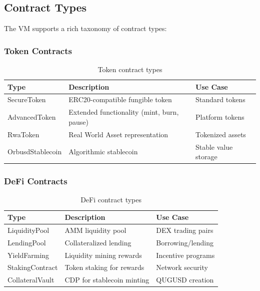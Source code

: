 \documentclass[11pt,a4paper]{article}
\begin{document}
\subsection{Contract Types}

The VM supports a rich taxonomy of contract types:

\subsubsection{Token Contracts}

\begin{table}[H]
\centering
\begin{tabular}{lll}
\toprule
\textbf{Type} & \textbf{Description} & \textbf{Use Case} \\
\midrule
SecureToken & ERC20-compatible fungible token & Standard tokens \\
AdvancedToken & Extended functionality (mint, burn, pause) & Platform tokens \\
RwaToken & Real World Asset representation & Tokenized assets \\
OrbusdStablecoin & Algorithmic stablecoin & Stable value storage \\
\bottomrule
\end{tabular}
\caption{Token contract types}
\end{table}

\subsubsection{DeFi Contracts}

\begin{table}[H]
\centering
\begin{tabular}{lll}
\toprule
\textbf{Type} & \textbf{Description} & \textbf{Use Case} \\
\midrule
LiquidityPool & AMM liquidity pool & DEX trading pairs \\
LendingPool & Collateralized lending & Borrowing/lending \\
YieldFarming & Liquidity mining rewards & Incentive programs \\
StakingContract & Token staking for rewards & Network security \\
CollateralVault & CDP for stablecoin minting & QUGUSD creation \\
\bottomrule
\end{tabular}
\caption{DeFi contract types}
\end{table}
\end{document}
